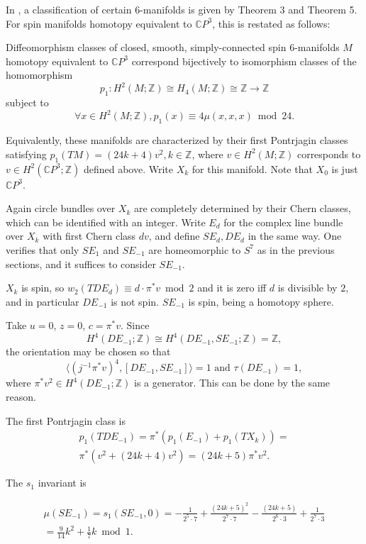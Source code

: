 \documentclass[twoside]{article}
\begin{document}
In \cite{wall}, a classification of certain $6$-manifolds is given by Theorem 3 and Theorem 5. For spin manifolds homotopy equivalent to $\mathbb{C}P^3$, this is restated as follows:
\begin{thm}
	Diffeomorphism classes of closed, smooth, simply-connected spin $6$-manifolds $M$ homotopy equivalent to $\mathbb{C}P^3$ correspond bijectively to isomorphism classes of the homomorphism
	\[
	p_1 \colon H^2(M;\mathbb{Z}) \cong  H_4(M;\mathbb{Z}) \cong  \mathbb{Z} \to  \mathbb{Z}
	\]
	subject to 
	\[
	\forall x\in H^2(M;\mathbb{Z}), p_1(x) \equiv  4\mu(x,x,x) \bmod 24. 
	\]
\end{thm}

Equivalently, these manifolds are characterized by their first Pontrjagin classes satisfying $ p_1(TM) = (24k  +  4)v^2,k\in \mathbb{Z}$, where $v\in H^2(M;\mathbb{Z})$ corresponds to $v\in H^2(\mathbb{C}P^3;\mathbb{Z})$ defined above. Write $X_k$ for this manifold. Note that $X_0$ is just $\mathbb{C}P^3$. 

Again circle bundles over $X_k$ are completely determined by their Chern classes, which can be identified with an integer. 
Write $E_d$ for the complex line bundle over $X_k$ with first Chern class $dv$, and define $SE_d, DE_d$ in the same way. One verifies that only $SE_{1}$ and $SE_{-1}$ are homeomorphic to $S^7$ as in the previous sections, and it suffices to consider $SE_{-1}$. 

$X_k$ is spin, so $w_2(TDE_d) \equiv  d\cdot \pi^* v \bmod 2$ and it is zero iff $d$ is divisible by $2$, and in particular $DE_{-1}$ is not spin. $SE_{-1}$ is spin, being a homotopy sphere. 

Take $u = 0$, $z = 0$, $c = \pi^*v$. 
Since 
\[
H^4(DE_{-1};\mathbb{Z}) \cong  H^4(DE_{-1},SE_{-1};\mathbb{Z}) = \mathbb{Z},
\] 
the orientation may be chosen so that
\[
\langle(j^{-1}\pi^*v)^4,[DE_{-1},SE_{-1}]\rangle = 1\text{ and }\tau(DE_{-1}) = 1, 
\]
where $\pi^*v^2\in H^4(DE_{-1};\mathbb{Z})$ is a generator. This can be done by the same reason. 

The first Pontrjagin class is 
\begin{gather*}
p_1(TDE_{-1}) = \pi^*(p_1(E_{-1}) + p_1(TX_k)) = \\
\pi^*(v^2 + (24k  +  4)v^2) = (24k  +  5)\pi^*v^2. 
\end{gather*}

The $s_1$ invariant is 

\begin{gather*}
\mu(SE_{-1}) = s_1(SE_{-1},0) = -\frac{1}{2^{5}  \cdot 7}  + \frac{ (24k  +  5)^2}{2^{7}  \cdot 7} 
-\frac{(24k  +  5)}{2^{6}  \cdot 3} + \frac{1}{2^{7}  \cdot 3}  \\
= \frac{9}{14}k^2 + \frac{1}{7}k\bmod 1 . 
\end{gather*}
\end{document}
